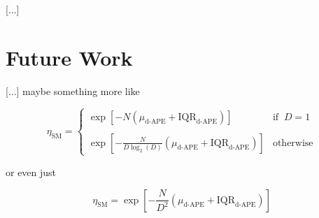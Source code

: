 \documentclass[conference]{IEEEtran}
\begin{document}
[...]

\section{Future Work}

[...] maybe something more like

\begin{equation}
	\eta_\textrm{SM} = \begin{cases}
		\exp\left[-N\left(\mu_\textrm{d-APE} + \textrm{IQR}_\textrm{d-APE}\right)\right] & \textrm{if}\;\;D=1 \\
		{} & {} \\
		\exp\left[-\frac{N}{D\log_2(D)}\left(\mu_\textrm{d-APE} + \textrm{IQR}_\textrm{d-APE}\right)\right] & \textrm{otherwise}
	\end{cases}
	\label{eqn:efficiency_proposition_2}
\end{equation}

\noindent or even just

\begin{equation}
	\eta_\textrm{SM} = \exp\left[-\frac{N}{D^2}\left(\mu_\textrm{d-APE} + \textrm{IQR}_\textrm{d-APE}\right)\right]
	\label{eqn:efficiency_proposition_3}
\end{equation}



{}

\end{document}
